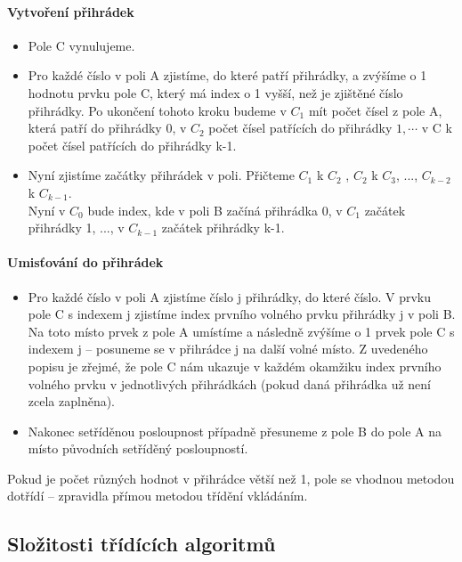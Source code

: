 \documentclass[10pt,a4paper]{article}
\begin{document}
\paragraph{Vytvoření přihrádek}
\begin{itemize}
	\item Pole C vynulujeme.
	\item Pro každé číslo v poli A zjistíme, do které patří přihrádky, a zvýšíme o 1 hodnotu prvku pole C, který má index o 1 vyšší, než je zjištěné číslo přihrádky. Po ukončení tohoto kroku budeme v $C_1$ mít počet čísel z pole A, která patří do přihrádky 0, v $C_2$ počet čísel patřících do přihrádky $1, \cdots $ v C k počet čísel patřících do přihrádky k-1.
	\item Nyní zjistíme začátky přihrádek v poli. Přičteme $C_1$ k $C_2$ , $C_2$ k $C_3$, ..., $C_{k-2}$ k $C_{k-1}$. \\
	Nyní v $C_0$ bude index, kde v poli B začíná přihrádka 0, v $C_1$ začátek přihrádky 1, ..., v $C_{k-1}$ začátek přihrádky k-1.
\end{itemize}
\paragraph{Umisťování do přihrádek}
\begin{itemize}
	\item Pro každé číslo v poli A zjistíme číslo j přihrádky, do které číslo. V prvku pole C s indexem j zjistíme index prvního volného prvku přihrádky j v poli B. Na toto místo prvek z pole A umístíme a následně zvýšíme o 1 prvek pole C s indexem j – posuneme se v přihrádce j na další volné místo. Z uvedeného popisu je zřejmé, že pole C nám ukazuje v každém okamžiku index prvního volného prvku v jednotlivých přihrádkách (pokud daná přihrádka už není zcela zaplněna).
	\item Nakonec setříděnou posloupnost případně přesuneme z pole B do pole A na místo původních setříděný posloupností.
\end{itemize}
Pokud je počet různých hodnot v přihrádce větší než 1, pole se vhodnou metodou dotřídí – zpravidla přímou metodou třídění vkládáním.



\newpage
\subsection{Složitosti třídících algoritmů}
\end{document}
